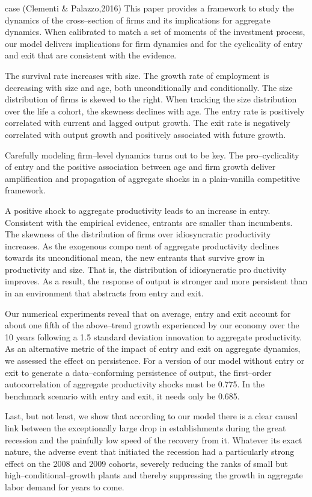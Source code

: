 \documentclass[
  12pt,
  oneside]{book}
\begin{document}
case (Clementi \& Palazzo,2016)
This paper provides a framework to study the dynamics of the cross--section of firms and its implications for aggregate dynamics. When calibrated to match a set of moments of the investment process, our model delivers implications for firm dynamics and for the cyclicality of entry and exit that are consistent with the evidence.

The survival rate increases with size. The growth rate of employment is decreasing with size and age, both unconditionally and conditionally. The size distribution of firms is skewed to the right. When tracking the size distribution over the life a cohort, the skewness declines with age. The entry rate is positively correlated with current and lagged output growth. The exit rate is negatively correlated with output growth and positively associated with future growth.

Carefully modeling firm--level dynamics turns out to be key. The pro--cyclicality of entry and the positive association between age and firm growth deliver amplification and propagation of aggregate shocks in a plain-vanilla competitive framework.

A positive shock to aggregate productivity leads to an increase in entry. Consistent with the empirical evidence, entrants are smaller than incumbents. The skewness of the distribution of firms over idiosyncratic productivity increases. As the exogenous component of aggregate productivity declines towards its unconditional mean, the new entrants that survive grow in productivity and size. That is, the distribution of idiosyncratic productivity improves. As a result, the response of output is stronger and more persistent than in an environment that abstracts from entry and exit.

Our numerical experiments reveal that on average, entry and exit account for about one fifth of the above--trend growth experienced by our economy over the 10 years following a 1.5 standard deviation innovation to aggregate productivity. As an alternative metric of the impact of entry and exit on aggregate dynamics, we assessed the effect on persistence. For a version of our model without entry or exit to generate a data--conforming persistence of output, the first--order autocorrelation of aggregate productivity shocks must be 0.775. In the benchmark scenario with entry and exit, it needs only be 0.685.

Last, but not least, we show that according to our model there is a clear causal link between the exceptionally large drop in establishments during the great recession and the painfully low speed of the recovery from it. Whatever its exact nature, the adverse event that initiated the recession had a particularly strong effect on the 2008 and 2009 cohorts, severely reducing the ranks of small but high--conditional--growth plants and thereby suppressing the growth in aggregate labor demand for years to come.
\end{document}
